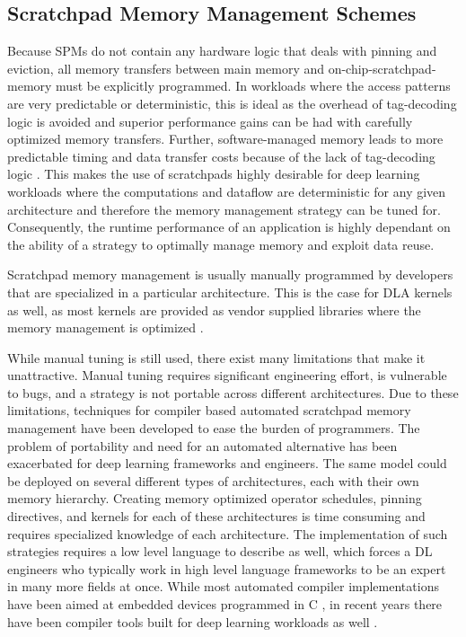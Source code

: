 \subsection{Scratchpad Memory Management Schemes}
Because SPMs do not contain any hardware logic that deals with pinning and
eviction, all memory transfers between main memory and on-chip-scratchpad-memory
must be explicitly programmed. In workloads where the access patterns are very
predictable or deterministic, this is ideal as the overhead of tag-decoding
logic is avoided and superior performance gains can be had with carefully
optimized memory transfers. Further, software-managed memory leads to more
predictable timing and data transfer costs because of the lack of
tag-decoding logic \cite{graphColoring}. This makes the use of scratchpads
highly desirable for deep learning workloads where the computations and
dataflow are deterministic for any given architecture and therefore the
memory management strategy can be tuned for. Consequently,
the runtime performance of an application is highly dependant on the
ability of a strategy to optimally manage memory and exploit data reuse.

Scratchpad memory management is usually manually programmed by developers
that are specialized in a particular architecture. This is the case for
DLA kernels as well, as most kernels are provided as vendor supplied libraries
where the memory management is optimized \cite{TVM}.

While manual tuning is still used, there exist many limitations that make it
unattractive. Manual tuning requires significant engineering effort, is
vulnerable to bugs, and a strategy is not portable across different
architectures.  Due to these limitations, techniques for compiler based
automated scratchpad memory management have been developed to ease the burden
of programmers. The problem of portability and need for an automated
alternative has been exacerbated for deep learning frameworks and engineers.
The same model could be deployed on several different types of architectures,
each with their own memory hierarchy.  Creating memory optimized operator
schedules, pinning directives, and kernels for each of these architectures is
time consuming and requires specialized knowledge of each architecture. The
implementation of such strategies requires a low level language to describe as
well, which forces a DL engineers who typically work in high level language
frameworks to be an expert in many more fields at once.  While most automated
compiler implementations have been aimed at embedded devices programmed in C
\cite{graphColoring} \cite{memoryColoring}, in recent years there have been
compiler tools built for deep learning workloads as well \cite{onsram}
\cite{toplib}.

